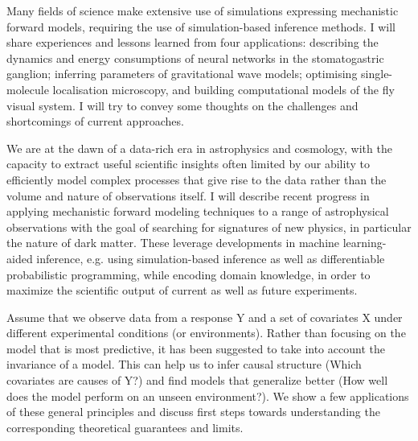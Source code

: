 \license

Many fields of science make extensive use of simulations expressing mechanistic forward models, requiring the use of simulation-based inference methods. I will share experiences and lessons learned from four applications: describing the dynamics and energy consumptions of neural networks in the stomatogastric ganglion; inferring parameters of gravitational wave models; optimising single-molecule localisation microscopy, and building computational models of the fly visual system. I will try to convey some thoughts on the challenges and shortcomings of current approaches.

\license

We are at the dawn of a data-rich era in astrophysics and cosmology, with the capacity to extract useful scientific insights often limited by our ability to efficiently model complex processes that give rise to the data rather than the volume and nature of observations itself. I will describe recent progress in applying mechanistic forward modeling techniques to a range of astrophysical observations with the goal of searching for signatures of new physics, in particular the nature of dark matter. These leverage developments in machine learning-aided inference, e.g. using simulation-based inference as well as differentiable probabilistic programming, while encoding domain knowledge, in order to maximize the scientific output of current as well as future experiments.

\license

Assume that we observe data from a response Y and a set of covariates X under different experimental conditions (or environments). Rather than focusing on the model that is most predictive, it has been suggested to take into account the invariance of a model. This can help us to infer causal structure (Which covariates are causes of Y?) and find models that generalize better (How well does the model perform on an unseen environment?). We show a few applications of these general principles and discuss first steps towards understanding the corresponding theoretical guarantees and limits.

